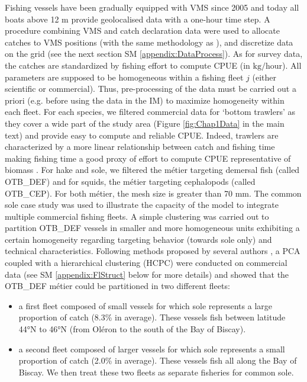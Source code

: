 Fishing vessels have been gradually equipped with VMS since 2005 and today all boats above 12 m provide geolocalised data with a one-hour time step. A procedure combining VMS and catch declaration data were used to allocate catches to VMS positions (with the same methodology as \textcite{gerritsen-integrating-2011,
hintzen-vmstools-2012,
murray-effectiveness-2013}), and discretize data on the grid (see the next section SM \ref{appendix:DataProcess}). As for survey data, the catches are standardized by fishing effort to compute CPUE (in \(\text{kg}/\text{hour}\)). 
All parameters are supposed to be homogeneous within a fishing fleet \(j\) (either scientific or commercial). Thus, pre-processing of the data must be carried out a priori (e.g. before using the data in the IM) to maximize homogeneity within each fleet. For each species, we filtered commercial data for ‘bottom trawlers’ as they cover a wide part of the study area (Figure \ref{fig:Chap1Data} in the main text) and provide easy to compute and reliable CPUE. Indeed, trawlers are characterized by a more linear relationship between catch and fishing time making fishing time a good proxy of effort to compute CPUE representative of biomass \parencite{hovgerd-manual-2008}. For hake and sole, we filtered the métier targeting demersal fish (called OTB_DEF) and for squids, the métier targeting cephalopods (called OTB_CEP). For both métier, the mesh size is greater than 70 mm.
The common sole case study was used to illustrate the capacity of the model to integrate multiple commercial fishing fleets. A simple clustering was carried out to partition OTB_DEF vessels in smaller and more homogeneous units exhibiting a certain homogeneity regarding targeting behavior (towards sole only) and technical characteristics. Following methods proposed by several authors \parencite{pelletier-multivariate-2000,
ferraris-fishing-2002,
stephens-multispecies-2004,
deporte-regional-2012,
winker-comparison-2013,
okamura-target-based-2018}, a PCA coupled with a hierarchical clustering (HCPC) were conducted on commercial data (see SM \ref{appendix:FlStruct} below for more details) and showed that the OTB_DEF métier could be partitioned in two different fleets:

\begin{itemize}
\item a first fleet composed of small vessels for which sole represents a large proportion of catch (8.3\% in average). These vessels fish between latitude 44°N to 46°N (from Oléron to the south of the Bay of Biscay).
\item a second fleet composed of larger vessels for which sole represents a small proportion of catch (2.0\% in average). These vessels fish all along the Bay of Biscay.
We then treat these two fleets as separate fisheries for common sole.
\end{itemize}

